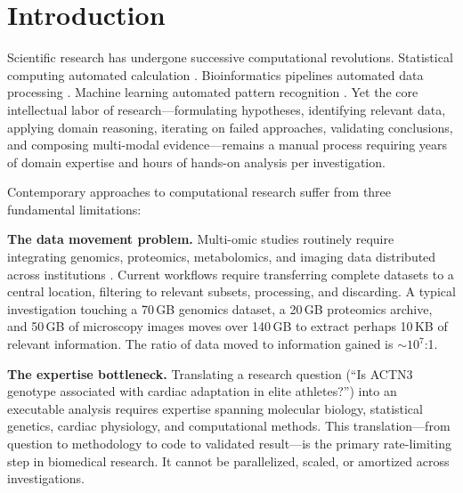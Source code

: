 \documentclass[10pt,twocolumn]{article}
\theoremstyle{definition}
\theoremstyle{remark}
\begin{document}
\begin{abstract}
\textbf{Keywords:} automated research, federated understanding, domain-specific language models, problem-directed extraction, metacognitive refinement, trajectory completion, categorical coordination, multi-modal composition, knowledge distillation
\end{abstract}

\section{Introduction}
\label{sec:introduction}

Scientific research has undergone successive computational revolutions. Statistical computing automated calculation \cite{vonneumann1945}. Bioinformatics pipelines automated data processing \cite{hasin2017}. Machine learning automated pattern recognition \cite{jumper2021}. Yet the core intellectual labor of research---formulating hypotheses, identifying relevant data, applying domain reasoning, iterating on failed approaches, validating conclusions, and composing multi-modal evidence---remains a manual process requiring years of domain expertise and hours of hands-on analysis per investigation.

Contemporary approaches to computational research suffer from three fundamental limitations:

\textbf{The data movement problem.} Multi-omic studies routinely require integrating genomics, proteomics, metabolomics, and imaging data distributed across institutions \cite{hasin2017,picard2021}. Current workflows require transferring complete datasets to a central location, filtering to relevant subsets, processing, and discarding. A typical investigation touching a 70\,GB genomics dataset, a 20\,GB proteomics archive, and 50\,GB of microscopy images moves over 140\,GB to extract perhaps 10\,KB of relevant information. The ratio of data moved to information gained is $\sim 10^7$:1.

\textbf{The expertise bottleneck.} Translating a research question (``Is ACTN3 genotype associated with cardiac adaptation in elite athletes?'') into an executable analysis requires expertise spanning molecular biology, statistical genetics, cardiac physiology, and computational methods. This translation---from question to methodology to code to validated result---is the primary rate-limiting step in biomedical research. It cannot be parallelized, scaled, or amortized across investigations.
\end{document}
